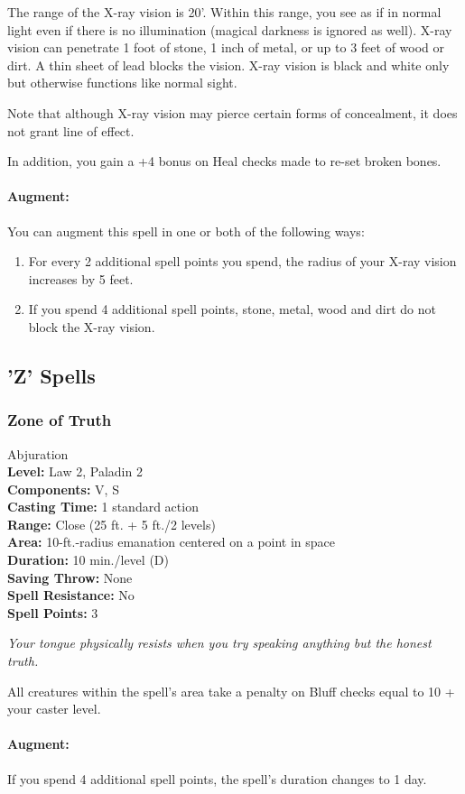 The range of the X-ray vision is 20'. Within this range, you see as if in normal light even if there is no illumination (magical darkness is ignored as well). X-ray vision can penetrate 1 foot of stone, 1 inch of metal, or up to 3 feet of wood or dirt. A thin sheet of lead blocks the vision.
X-ray vision is black and white only but otherwise functions like normal sight.

Note that although X-ray vision may pierce certain forms of concealment, it does not grant line of effect.

In addition, you gain a +4 bonus on Heal checks made to re-set broken bones.

\paragraph{Augment:} You can augment this spell in one or both of the following ways:
\begin{enumerate}
 \item For every 2 additional spell points you spend, the radius of your X-ray vision increases by 5 feet.
 \item If you spend 4 additional spell points, stone, metal, wood and dirt do not block the X-ray vision. 
\end{enumerate}

\subsection{'Z' Spells}
\subsubsection{Zone of Truth}
\label{Spell:ZoneOfTruth}
Abjuration
\\ \textbf{Level:} Law 2, Paladin 2
\\ \textbf{Components:} V, S
\\ \textbf{Casting Time:} 1 standard action
\\ \textbf{Range:} Close (25 ft. + 5 ft./2 levels)
\\ \textbf{Area:} 10-ft.-radius emanation centered on a point in space
\\ \textbf{Duration:} 10 min./level (D)
\\ \textbf{Saving Throw:} None
\\ \textbf{Spell Resistance:} No
\\ \textbf{Spell Points:} 3

\emph{Your tongue physically resists when you try speaking anything but the honest truth.}

All creatures within the spell's area take a penalty on Bluff checks equal to 10 + your caster level.

\paragraph{Augment:} If you spend 4 additional spell points, the spell's duration changes to 1 day.


